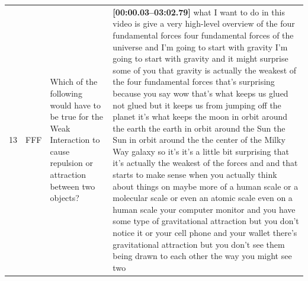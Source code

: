 \documentclass[10pt]{article}
\begin{document}
\begin{tiny}
\begin{longtable}{r p{0.3in} p{1.212in} p{3.8in}}
    13 &          FFF &                                                                                                                                                      Which of the following would have to be true for the Weak Interaction to cause repulsion or attraction between two objects? &                                                                                                                                                                                                                                                                                                                                                                                                                                                                                                                                                                                                                                                                                                                                                                                                                                                                                                                                                                                                                                                                                                                                                                                                                                                                                                                                                                                                                                                                                                                                                                                                                                                                                                                                                                                                                                                                                                                                                 \textbf{[00:00.03--03:02.79]} what I want to do in this video is give a very high-level overview of the four fundamental forces four fundamental forces of the universe and I'm going to start with gravity I'm going to start with gravity and it might surprise some of you that gravity is actually the weakest of the four fundamental forces that's surprising because you say wow that's what keeps us glued not glued but it keeps us from jumping off the planet it's what keeps the moon in orbit around the earth the earth in orbit around the Sun the Sun in orbit around the the center of the Milky Way galaxy so it's it's a little bit surprising that it's actually the weakest of the forces and and that starts to make sense when you actually think about things on maybe more of a human scale or a molecular scale or even an atomic scale even on a human scale your computer monitor and you have some type of gravitational attraction but you don't notice it or your cell phone and your wallet there's gravitational attraction but you don't see them being drawn to each other the way you might see two 
\end{longtable}
\end{tiny}
\end{document}

